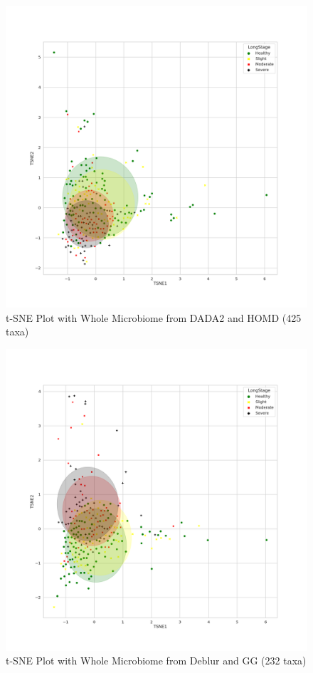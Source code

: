 \documentclass[a4paper]{article}
\begin{document}
            \begin{figure}[p]
                \centering
                \includegraphics[width=0.6 \linewidth]{figures/tSNE/Whole/whole.DADA2.homd.png}
                \caption{t-SNE Plot with Whole Microbiome from DADA2 and HOMD (425 taxa)}
                \label{fig:tsne-whole-dada2-homd}
            \end{figure}

            \begin{figure}[p]
                \centering
                \includegraphics[width=0.6 \linewidth]{figures/tSNE/Whole/whole.Deblur.gg.png}
                \caption{t-SNE Plot with Whole Microbiome from Deblur and GG (232 taxa)}
                \label{fig:tsne-whole-deblur-gg}
            \end{figure}
\end{document}
